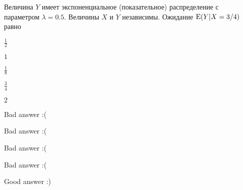 
\begin{question}
Величина \(Y\) имеет экспоненциальное (показательное) распределение с
параметром \(\lambda=0.5\). Величины \(X\) и \(Y\) независимы. Ожидание
\(\operatorname{E}(Y|X=3/4)\) равно
\begin{answerlist}
  \item \(\frac{1}{2}\)
  \item \(1\)
  \item \(\frac{1}{8}\)
  \item \(\frac{3}{4}\)
  \item \(2\)
\end{answerlist}
\end{question}

\begin{solution}
\begin{answerlist}
  \item Bad answer :(
  \item Bad answer :(
  \item Bad answer :(
  \item Bad answer :(
  \item Good answer :)
\end{answerlist}
\end{solution}

